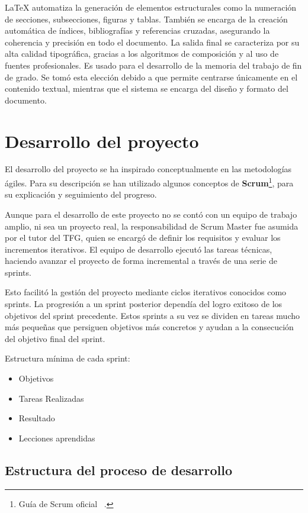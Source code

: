 \documentclass[a4paper, 12pt]{book}
\let\cleardoublepage\clearpage
\begin{document}
LaTeX automatiza la generación de elementos estructurales como la numeración de secciones, subsecciones, figuras y tablas. También se encarga de la creación automática de índices, bibliografías y referencias cruzadas, asegurando la coherencia y precisión en todo el documento. La salida final se caracteriza por su alta calidad tipográfica, gracias a los algoritmos de composición y al uso de fuentes profesionales.
Es usado para el desarrollo de la memoria del trabajo de fin de grado. Se tomó esta elección debido a que permite centrarse únicamente en el contenido textual, mientras que el sistema se encarga del diseño y formato del documento.
\chapter{Desarrollo del proyecto}
\label{chap:Desarrollo}

El desarrollo del proyecto se ha inspirado conceptualmente en las metodologías ágiles. 
Para su descripción se han utilizado algunos conceptos de \textbf{Scrum}\footnote{Guía de Scrum oficial ~\cite{SchwaberSutherland2020}.}, para su explicación y seguimiento del progreso.

Aunque para el desarrollo de este proyecto no se contó con un equipo de trabajo amplio, ni sea un proyecto real,
la responsabilidad de Scrum Master fue asumida por el tutor del TFG, quien se encargó de definir los requisitos y evaluar los incrementos iterativos.
El equipo de desarrollo ejecutó las tareas técnicas, haciendo avanzar el proyecto de forma incremental a través de una serie de sprints.

Esto facilitó la gestión del proyecto mediante ciclos iterativos conocidos como sprints.
La progresión a un sprint posterior dependía del logro exitoso de los objetivos del sprint precedente.
Estos sprints a su vez se dividen en tareas mucho más pequeñas que persiguen objetivos más concretos y ayudan a la consecución del objetivo final del sprint.

Estructura mínima de cada sprint:
\begin{itemize}
\setlength\itemsep{0.3em}  %
\item Objetivos
\item Tareas Realizadas
\item Resultado
\item Lecciones aprendidas
\end{itemize}

\cleardoublepage

\section{Estructura del proceso de desarrollo}
\label{sec:arquitectura}
\end{document}

